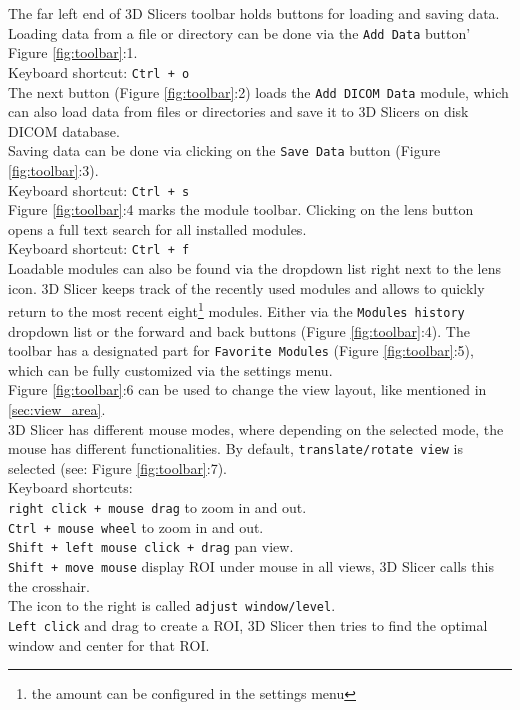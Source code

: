 \noindent
The far left end of 3D Slicers toolbar holds buttons for loading and saving data.
Loading data  from a file or directory can be done via the \texttt{Add Data} button' Figure \ref{fig:toolbar}:1.\\
Keyboard shortcut: \texttt{Ctrl + o}\\
The next button (Figure \ref{fig:toolbar}:2) loads the \texttt{Add DICOM Data} module, which can also load data from files or directories and save it to 3D Slicers on disk DICOM database.\\
Saving data can be done via clicking on the \texttt{Save Data} button (Figure \ref{fig:toolbar}:3).\\Keyboard shortcut: \texttt{Ctrl + s}\\
Figure \ref{fig:toolbar}:4 marks the module toolbar. Clicking on the lens button opens a full text search for all installed modules.\\
Keyboard shortcut: \texttt{Ctrl + f}\\
Loadable modules can also be found via the dropdown list right next to the lens icon.
3D Slicer keeps track of the recently used modules and allows to quickly return to the most recent eight\footnote{the amount can be configured in the settings menu} modules.
Either via the \texttt{Modules history} dropdown list or the forward and back buttons (Figure \ref{fig:toolbar}:4).
The toolbar has a designated part for \texttt{Favorite Modules} (Figure \ref{fig:toolbar}:5), which can be fully customized via the settings menu.\\
Figure \ref{fig:toolbar}:6 can be used to change the view layout, like mentioned in \cref{sec:view_area}.\\
3D Slicer has different mouse modes, where depending on the selected mode, the mouse has different functionalities. By default, \texttt{translate/rotate view} is selected (see: Figure \ref{fig:toolbar}:7).\\
Keyboard shortcuts:\\
\texttt{right click + mouse drag} to zoom in and out.\\
\texttt{Ctrl + mouse wheel} to zoom in and out.\\
\texttt{Shift + left mouse click + drag} pan view.\\
\texttt{Shift + move mouse} display ROI under mouse in all views, 3D Slicer calls this the crosshair.\\
\noindent
The icon to the right is called \texttt{adjust window/level}.\\
\texttt{Left click} and drag to create a ROI, 3D Slicer then tries to find the optimal window and center for that ROI.\\
